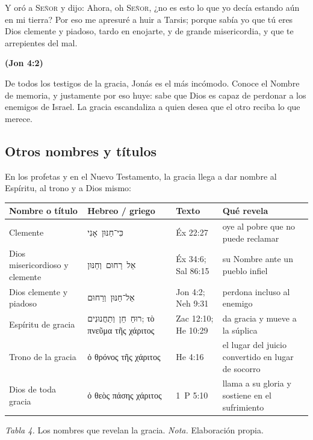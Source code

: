 \documentclass[11pt,letterpaper]{article}
\newcommand{\heb}[1]{\mbox{\foreignlanguage{hebrew}{#1}}}
\newcommand{\grc}[1]{\foreignlanguage{ancientgreek}{#1}}
\newcommand{\SENOR}{\textsc{Señor}}
\newcommand{\fuente}[1]{\par\hfill{\upshape\bfseries\small\textcolor{azul}{#1}}}
\begin{document}
\begin{cita}Y oró a \SENOR{} y dijo: Ahora, oh \SENOR, ¿no es esto lo que yo decía estando aún en mi tierra? Por eso me apresuré a huir a Tarsis; porque sabía yo que tú eres Dios clemente y piadoso, tardo en enojarte, y de grande misericordia, y que te arrepientes del mal.\fuente{(Jon 4:2)}\end{cita}

De todos los testigos de la gracia, Jonás es el más incómodo. Conoce el Nombre de memoria, y justamente por eso huye: sabe que Dios es capaz de perdonar a los enemigos de Israel. La gracia escandaliza a quien desea que el otro reciba lo que merece.

\subsection{Otros nombres y títulos}
En los profetas y en el Nuevo Testamento, la gracia llega a dar nombre al Espíritu, al trono y a Dios mismo:

\begin{center}\small\renewcommand{\arraystretch}{1.22}
\begin{tabular}{@{}L{3.2cm}L{3.6cm}L{2.6cm}L{5.0cm}@{}}
\toprule
\textbf{Nombre o título} & \textbf{Hebreo / griego} & \textbf{Texto} & \textbf{Qué revela} \\ \midrule
Clemente & \heb{כִּי־חַנּוּן אָנִי} & Éx 22:27 & oye al pobre que no puede reclamar \\
Dios misericordioso y clemente & \heb{אֵל רַחוּם וְחַנּוּן} & Éx 34:6; Sal 86:15 & su Nombre ante un pueblo infiel \\
Dios clemente y piadoso & \heb{אֵל־חַנּוּן וְרַחוּם} & Jon 4:2; Neh 9:31 & perdona incluso al enemigo \\
Espíritu de gracia & \heb{רוּחַ חֵן וְתַחֲנוּנִים}; \grc{τὸ πνεῦμα τῆς χάριτος} & Zac 12:10; He 10:29 & da gracia y mueve a la súplica \\
Trono de la gracia & \grc{ὁ θρόνος τῆς χάριτος} & He 4:16 & el lugar del juicio convertido en lugar de socorro \\
Dios de toda gracia & \grc{ὁ θεὸς πάσης χάριτος} & 1~P 5:10 & llama a su gloria y sostiene en el sufrimiento \\
\bottomrule
\end{tabular}\par
{\footnotesize\color{gris}\textit{Tabla 4.} Los nombres que revelan la gracia. \textit{Nota.} Elaboración propia.}
\end{center}
\end{document}

